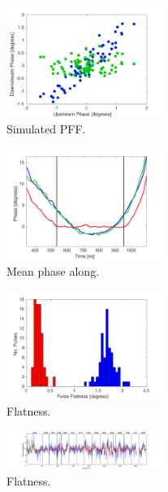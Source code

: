 \begin{figure}
  \centering
  \includegraphics[width=0.45\textwidth]{Figures/feedforward/BestFF_Simulated}
  \caption{Simulated PFF.}
  \label{f:BestFF_Simulated}
\end{figure}


\begin{figure}
  \centering
  \includegraphics[width=0.45\textwidth]{Figures/feedforward/BestFF_MeanPhaseAlong}
  \caption{Mean phase along.}
  \label{f:BestFF_MeanPhaseAlong}
\end{figure}

\begin{figure}
  \centering
  \includegraphics[width=0.45\textwidth]{Figures/feedforward/BestFF_Flatness}
  \caption{Flatness.}
  \label{f:BestFF_Flatness}
\end{figure}


\begin{figure}
  \centering
  \includegraphics[width=0.45\textwidth]{Figures/feedforward/longFF_history}
  \caption{Flatness.}
  \label{f:longFF_history}
\end{figure}

